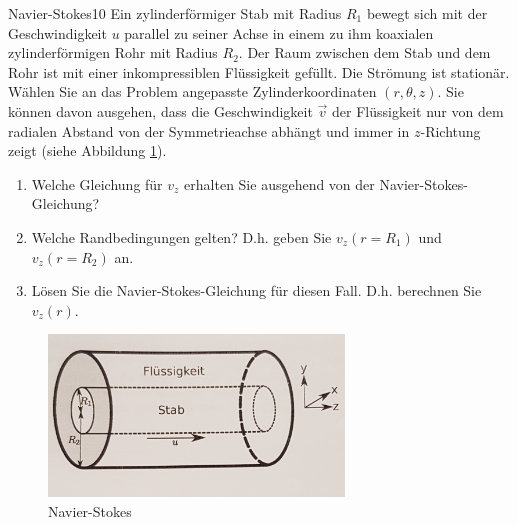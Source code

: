   \begin{exercise}{Navier-Stokes}{10}
    Ein zylinderförmiger Stab mit Radius $R_1$ bewegt sich mit der Geschwindigkeit $u$
    parallel zu seiner Achse in einem zu ihm koaxialen zylinderförmigen Rohr mit Radius
    $R_2$. Der Raum zwischen dem Stab und dem Rohr ist mit einer inkompressiblen
    Flüssigkeit gefüllt. Die Strömung ist stationär.\\
    Wählen Sie an das Problem angepasste Zylinderkoordinaten $(r, \theta, z)$. Sie
    können davon ausgehen, dass die Geschwindigkeit $\vec{v}$ der Flüssigkeit nur von
    dem radialen Abstand von der Symmetrieachse abhängt und immer in $z$-Richtung zeigt
    (siehe Abbildung \ref{fig:Skizze_Koaxial}).

    \begin{enumerate}
      \item Welche Gleichung für $v_z$ erhalten Sie ausgehend von der Navier-Stokes-Gleichung?
      \item Welche Randbedingungen gelten? D.h. geben Sie $v_z(r = R_1)$ und $v_z(r = R_2)$ an.
      \item Lösen Sie die Navier-Stokes-Gleichung für diesen Fall. D.h. berechnen Sie $v_z(r)$.
    \end{enumerate}

    \begin{figure}[h]
      \centering
      \includegraphics[width=0.7\textwidth]{Skizze_Navier_Stokes.jpg}
      \caption{Navier-Stokes}
      \label{fig:Skizze_Koaxial}
    \end{figure}

  \end{exercise}

\FloatBarrier
\newpage

